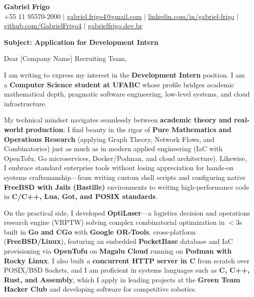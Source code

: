 \documentclass[letterpaper,10pt]{article}
\newcommand{\targetRole}{Development Intern}
\newcommand{\targetCompany}{[Company Name]}
\begin{document}
\begin{center}
  \textbf{\Huge Gabriel Frigo} \\ \vspace{4pt}
  \small +55 11 95570-2000 $|$ \href{mailto:gabriel.frigo4@gmail.com}{gabriel.frigo4@gmail.com} $|$
  \href{https://linkedin.com/in/gabriel-frigo-b6727b275/}{linkedin.com/in/gabriel-frigo} $|$
  \href{https://github.com/GabrielFrigo4}{github.com/GabrielFrigo4} $|$
  \href{https://gabrielfrigo.dev.br}{gabrielfrigo.dev.br}
\end{center}

\vspace{6pt}

\textbf{Subject: Application for \targetRole}

Dear \targetCompany{} Recruiting Team,

I am writing to express my interest in the \textbf{\targetRole} position. I am a \textbf{Computer Science student at UFABC} whose profile bridges academic mathematical depth, pragmatic software engineering, low-level systems, and cloud infrastructure.

My technical mindset navigates seamlessly between \textbf{academic theory and real-world production}: I find beauty in the rigor of \textbf{Pure Mathematics and Operations Research} (applying Graph Theory, Network Flows, and Combinatorics) just as much as in modern applied engineering (IaC with OpenTofu, Go microservices, Docker/Podman, and cloud architecture). Likewise, I embrace standard enterprise tools without losing appreciation for hands-on systems craftsmanship---from writing custom shell scripts and configuring native \textbf{FreeBSD with Jails (Bastille)} environments to writing high-performance code in \textbf{C/C++, Lua, Got, and POSIX standards}.

On the practical side, I developed \textbf{OptiLaser}---a logistics decision and operations research engine (VRPTW) solving complex combinatorial optimization in $<3$s built in \textbf{Go and CGo} with \textbf{Google OR-Tools}, cross-platform (\textbf{FreeBSD/Linux}), featuring an embedded \textbf{PocketBase} database and IaC provisioning via \textbf{OpenTofu} on \textbf{Magalu Cloud} running on \textbf{Podman with Rocky Linux}. I also built a \textbf{concurrent HTTP server in C} from scratch over POSIX/BSD Sockets, and I am proficient in systems languages such as \textbf{C, C++, Rust, and Assembly}, which I apply in leading projects at the \textbf{Green Team Hacker Club} and developing software for competitive robotics.
\end{document}
